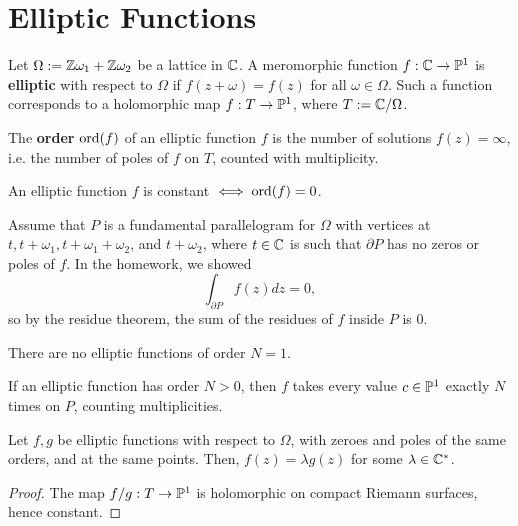 \documentclass[11pt]{article}
\begin{document}
\section{Elliptic Functions}

\begin{defn}
    Let $\Omega:= \Z\omega_1  +\Z\omega_2$ be a lattice in $\C$. A meromorphic function $f:\C \to \P^1$ is \textbf{elliptic} with respect to $\Omega$ if $f(z+\omega)=f(z)$ for all $\omega \in \Omega$. Such a function corresponds to a holomorphic map $f:T \to \P^1$, where $T:=\C/\Omega$.
\end{defn}

\begin{defn}
    The \textbf{order} $\ord(f)$ of an elliptic function $f$ is the number of solutions $f(z) = \infty$, i.e. the number of poles of $f$ on $T$, counted with multiplicity.
\end{defn}

\begin{rmk}
    An elliptic function $f$ is constant $\iff \ord(f)=0$.
\end{rmk}

Assume that $P$ is a fundamental parallelogram for $\Omega$ with vertices at $t,t+\omega_1,t+\omega_1+\omega_2$, and $t+\omega_2$, where $t \in \C$ is such that $\partial P$ has no zeros or poles of $f$. In the homework, we showed
$$\int_{\partial P}f(z)dz =0,$$
so by the residue theorem, the sum of the residues of $f$ inside $P$ is $0$.

\begin{cor}
    There are no elliptic functions of order $N=1$.
\end{cor}

\begin{cor}
    If an elliptic function has order $N>0$, then $f$ takes every value $c \in \P^1$ exactly $N$ times on $P$, counting multiplicities.
\end{cor}

\begin{cor}[][label=cor:f_eq_lamg]
    Let $f,g$ be elliptic functions with respect to $\Omega$, with zeroes and poles of the same orders, and at the same points. Then, $f(z) = \lambda g(z)$ for some $\lambda \in \C^*$.
\end{cor}

\begin{proof}
    The map $f/g:T \to \P^1$ is holomorphic on compact Riemann surfaces, hence constant.
\end{proof}
\end{document}
